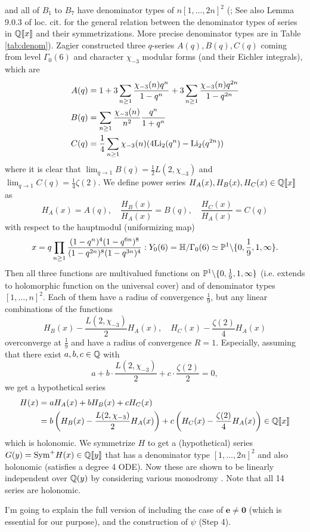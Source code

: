 and all of $B_1$ to $B_7$ have denominator types of $n[1, \dots, 2n]^2$ (\cite[Lemma 10.2.2]{calegari2024linear}; See also Lemma 9.0.3 of loc. cit. for the general relation between the denominator types of series in $\mathbb{Q}\llbracket x \rrbracket$ and their symmetrizations. More precise denominator types are in Table \ref{tab:denom}).
Zagier \cite{zagier2009integral} constructed three $q$-series $A(q), B(q), C(q)$ coming from level $\Gamma_0(6)$ and character $\chi_{-3}$ modular forms (and their Eichler integrals), which are
\begin{align*}
    A(q) &= 1 + 3 \sum_{n \ge 1} \frac{\chi_{-3}(n)q^n}{1 - q^n} + 3 \sum_{n \ge 1} \frac{\chi_{-3}(n)q^{2n}}{1 - q^{2n}} \\
    B(q) &= \sum_{n \ge 1} \frac{\chi_{-3}(n)}{n^2} \frac{q^n}{1 + q^n} \\
    C(q) &= \frac{1}{4}\sum_{n \ge 1} \chi_{-3}(n) (4 \mathrm{Li}_2(q^n) - \mathrm{Li}_2(q^{2n}))
\end{align*}
where it is clear that $\lim_{q \to 1} B(q) = \frac{1}{2} L(2, \chi_{-3})$ and $\lim_{q \to 1} C(q) = \frac{1}{4} \zeta(2)$.
We define power series $H_A(x), H_B(x), H_C(x) \in \mathbb{Q} \llbracket x \rrbracket$ as
$$
    H_A(x) = A(q), \quad \frac{H_B(x)}{H_A(x)} = B(q), \quad \frac{H_C(x)}{H_A(x)} = C(q)
$$
with respect to the hauptmodul (uniformizing map)
$$
    x = q \prod_{n \ge 1} \frac{(1 - q^n)^4 (1 - q^{6n})^8}{(1 - q^{2n})^{8} (1 - q^{3n})^{4}}: Y_0(6) = \mathbb{H} / \Gamma_0(6) \simeq \mathbb{P}^1 \backslash \{0, \frac{1}{9}, 1, \infty \}.
$$
Then all three functions are multivalued functions on $\mathbb{P}^1 \backslash \{0, \frac{1}{9}, 1, \infty\}$ (i.e. extends to holomorphic function on the universal cover) and of denominator types $[1, \dots, n]^2$.
Each of them have a radius of convergence $\frac{1}{9}$, but any linear combinations of the functions
$$
    H_B(x) - \frac{L(2, \chi_{-3})}{2} H_A(x), \quad H_C(x) - \frac{\zeta(2)}{4} H_A(x)
$$
overconverge at $\frac{1}{9}$ and have a radius of convergence $R = 1$.
Especially, assuming that there exist $a, b, c \in \mathbb{Q}$ with
\begin{equation}
    \label{eqn:lindep}
    a + b\cdot \frac{L(2, \chi_{-3})}{2} + c \cdot \frac{\zeta(2)}{2} = 0,
\end{equation}
we get a hypothetical series
\begin{align}
    H(x) &= aH_A(x) + bH_B(x) + cH_C(x) \nonumber \\
    &= b \left( H_B(x) - \frac{L(2, \chi_{-3})}{2} H_A(x)\right) + c \left(H_C(x) - \frac{\zeta(2)}{4} H_A(x)\right) \in \mathbb{Q} \llbracket x \rrbracket \label{eqn:H}
\end{align}
which is holonomic.
We symmetrize $H$ to get a (hypothetical) series $G(y) = \mathrm{Sym}^+ H(x) \in \mathbb{Q} \llbracket y \rrbracket$ that has a denominator type $[1, \dots, 2n]^2$ and also holonomic (satisfies a degree 4 ODE).
Now these are shown to be linearly independent over $\mathbb{Q}(y)$ by considering various monodromy \cite[Section 12]{calegari2024linear}.
Note that all 14 series are holonomic.

I'm going to explain the full version of \cite[Theorem 7.0.1]{calegari2024linear} including the case of $\mathbf{e} \ne \mathbf{0}$ (which is essential for our purpose), and the construction of $\psi$ (Step 4).
